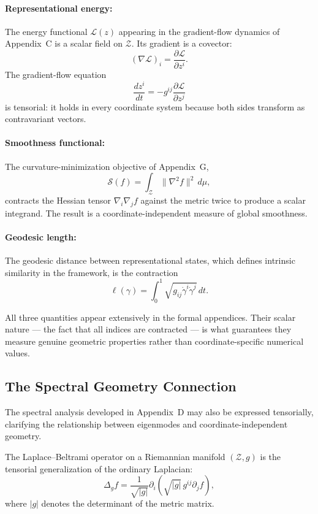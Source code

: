 \documentclass[12pt,a4paper]{article}
\begin{document}
\paragraph{Representational energy:}
The energy functional $\mathcal{L}(z)$ appearing in the gradient-flow dynamics of Appendix~C is a scalar field on $\mathcal{Z}$. Its gradient is a covector:
\[
(\nabla \mathcal{L})_i = \frac{\partial \mathcal{L}}{\partial z^i}.
\]
The gradient-flow equation
\[
\frac{dz^i}{dt} = -g^{ij} \frac{\partial \mathcal{L}}{\partial z^j}
\]
is tensorial: it holds in every coordinate system because both sides transform as contravariant vectors.

\paragraph{Smoothness functional:}
The curvature-minimization objective of Appendix~G,
\[
\mathcal{S}(f) = \int_{\mathcal{Z}} \|\nabla^2 f\|^2 \, d\mu,
\]
contracts the Hessian tensor $\nabla_i \nabla_j f$ against the metric twice to produce a scalar integrand. The result is a coordinate-independent measure of global smoothness.

\paragraph{Geodesic length:}
The geodesic distance between representational states, which defines intrinsic similarity in the framework, is the contraction
\[
\ell(\gamma) = \int_0^1 \sqrt{g_{ij} \dot\gamma^i \dot\gamma^j} \, dt.
\]

All three quantities appear extensively in the formal appendices. Their scalar nature --- the fact that all indices are contracted --- is what guarantees they measure genuine geometric properties rather than coordinate-specific numerical values.

\subsection{The Spectral Geometry Connection}

The spectral analysis developed in Appendix~D may also be expressed tensorially, clarifying the relationship between eigenmodes and coordinate-independent geometry.

The Laplace--Beltrami operator on a Riemannian manifold $(\mathcal{Z}, g)$ is the tensorial generalization of the ordinary Laplacian:
\[
\Delta_g f = \frac{1}{\sqrt{|g|}} \partial_i \left( \sqrt{|g|} \, g^{ij} \partial_j f \right),
\]
where $|g|$ denotes the determinant of the metric matrix.
\end{document}
